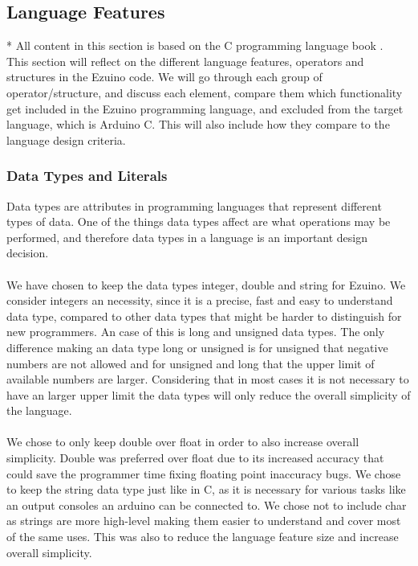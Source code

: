 \subsection{Language Features}
\label{language-features}
* All content in this section is based on the C programming language book \cite{kernighan1988c}.\\
This section will reflect on the different language features, operators and structures in the Ezuino code. We will go through each group of operator/structure, and discuss each element, compare them which functionality get included in the Ezuino programming language, and excluded from the target language, which is Arduino C. This will also include how they compare to the language design criteria.\\
\subsubsection*{Data Types and Literals}
Data types are attributes in programming languages that represent different types of data. One of the things data types affect are what operations may be performed, and therefore data types in a language is an important design decision. 
\\ \\
We have chosen to keep the data types integer, double and string for Ezuino. We consider integers an necessity, since it is a precise, fast and easy to understand data type, compared to other data types that might be harder to distinguish for new programmers. An case of this is long and unsigned data types. The only difference making an data type long or unsigned is for unsigned that negative numbers are not allowed and for unsigned and long that the upper limit of available numbers are larger. Considering that in most cases it is not necessary to have an larger upper limit the data types will only reduce the overall simplicity of the language. 
\\  \\
We chose to only keep double over float in order to also increase overall simplicity. Double was preferred over float due to its increased accuracy that could save the programmer time fixing floating point inaccuracy bugs.  We chose to keep the string data type just like in C, as it is necessary for various tasks like an output consoles an arduino can be connected to. We chose not to include char as strings are more high-level making them easier to understand and cover most of the same uses. This was also to reduce the language feature size and increase overall simplicity. 
